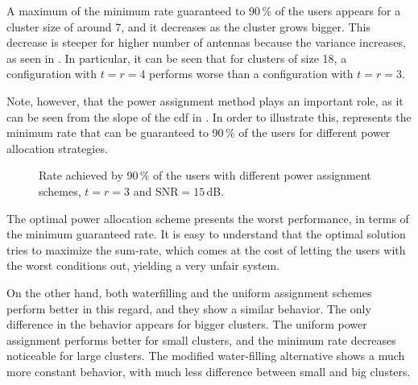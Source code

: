 A maximum of the minimum rate guaranteed to 90\,\% of the users appears for a
cluster size of around 7, and it decreases as the cluster grows bigger. This
decrease is steeper for higher number of antennas because the variance
increases, as seen in . In particular, it can be seen
that for clusters of size 18, a configuration with $t=r=4$ performs worse than a
configuration with $t=r=3$.

Note, however, that the power assignment method plays an important role, as it
can be seen from the slope of the \gls{cdf} in . In
order to illustrate this,  represents the minimum
rate that can be guaranteed to 90\,\% of the users for different power
allocation strategies.

\begin{figure}[t]
\begin{center}
    \dummybox
\end{center}
\caption{Rate achieved by 90\,\% of the users with different power assignment
schemes, $t=r=3$ and SNR$=15$\,dB.}
\label{fig:min_rate_power_alloc}
\end{figure}

The optimal power allocation scheme presents the worst performance, in terms of
the minimum guaranteed rate. It is easy to understand that the optimal solution
tries to maximize the sum-rate, which comes at the cost of letting the users
with the worst conditions out, yielding a very unfair system.

On the other hand, both waterfilling and the uniform assignment schemes perform
better in this regard, and they show a similar behavior. The only difference in
the behavior appears for bigger clusters. The uniform power assignment performs
better for small clusters, and the minimum rate decreases noticeable for large
clusters. The modified water-filling alternative shows a much more constant
behavior, with much less difference between small and big clusters.
